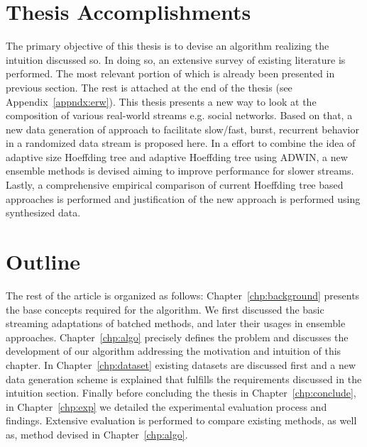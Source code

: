 \section{Thesis Accomplishments}
The primary objective of this thesis is to devise an algorithm realizing the intuition discussed so. In doing so, an extensive survey of existing literature is performed. The most relevant portion of which is already been presented in previous section. The rest is attached at the end of the thesis (see Appendix~\ref{appndx:erw}). This thesis presents a new way to look at the composition of various real-world streams e.g. social networks. Based on that, a new data generation of approach to facilitate slow/fast, burst, recurrent behavior in a randomized data stream is proposed here. In a effort to combine the idea of adaptive size Hoeffding tree and adaptive Hoeffding tree using ADWIN, a new ensemble methods is devised aiming to improve performance for slower streams. Lastly, a comprehensive empirical comparison of current Hoeffding tree based approaches is performed and justification of the new approach is performed using synthesized data.


\section{Outline}
The rest of the article is organized as follows: Chapter~\ref{chp:background} presents the base concepts required for the algorithm. We first discussed the basic streaming adaptations of batched methods, and later their usages in ensemble approaches. Chapter~\ref{chp:algo} precisely defines the problem and discusses the development of our algorithm addressing the motivation and intuition of this chapter. In Chapter~\ref{chp:dataset} existing datasets are discussed first and a new data generation scheme is explained that fulfills the requirements discussed in the intuition section. Finally before concluding the thesis in Chapter~\ref{chp:conclude}, in Chapter~\ref{chp:exp} we detailed the experimental evaluation process and findings. Extensive evaluation is performed to compare existing methods, as well as, method devised in Chapter~\ref{chp:algo}. 
